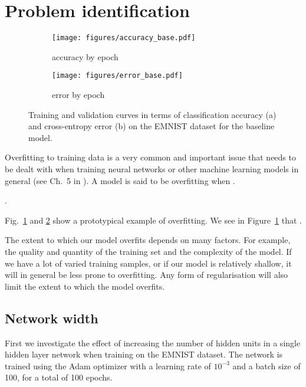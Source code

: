\documentclass{article}
\begin{document}
\section{Problem identification}
\label{sec:task1}

\begin{figure}[t]
    \centering
    \begin{subfigure}{\linewidth}
        \texttt{[image: figures/accuracy\_base.pdf]}
        \caption{accuracy by epoch}
        \label{fig:example_acccurves}
    \end{subfigure} 
    \begin{subfigure}{\linewidth}
        \centering
        \texttt{[image: figures/error\_base.pdf]}
        \caption{error by epoch}
        \label{fig:example_errorcurves}
    \end{subfigure} 
    \caption{Training and validation curves in terms of classification accuracy (a) and cross-entropy error (b) on the EMNIST dataset for the baseline model.}
    \label{fig:example}
\end{figure} 

Overfitting to training data is a very common and important issue that needs to be dealt with when training neural networks or other machine learning models in general (see Ch.~5 in \citealt{Goodfellow-et-al-2016}).
A model is said to be overfitting when \questionFive.

\questionSix.

Fig.~\ref{fig:example_acccurves} and \ref{fig:example_errorcurves} show a prototypical example of overfitting.
We see in Figure~\ref{fig:example_acccurves} that \questionSeven.

The extent to which our model overfits depends on many factors.
For example, the quality and quantity of the training set and
the complexity of the model. If we have a lot of varied training samples,
or if our model is relatively shallow, it will in general
be less prone to overfitting. Any form of regularisation
will also limit the extent to which the model overfits.


\subsection{Network width}

\questionTableOne
\questionFigureTwo


First we investigate the effect of increasing the number of
hidden units in a single hidden layer network when training
on the EMNIST dataset.
The network is trained using the Adam optimizer
with a learning rate of $10^{-3}$ and a batch size of 100, for a total of 100 epochs.
\end{document}
